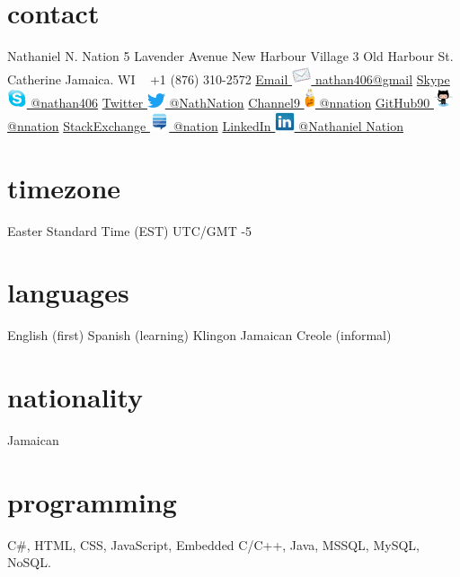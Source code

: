 \documentclass[]{friggeri-cvRS}
\begin{document}
\begin{aside}
  \section{contact}
    Nathaniel N. Nation
    5 Lavender Avenue
    New Harbour Village 3
    Old Harbour
    St. Catherine
    Jamaica. WI
    ~
    +1 (876) 310-2572
    \href{mailto:nathan406@gmail.com}{Email \includegraphics[height=16pt]{images/email.png}
    nathan406@gmail}
    \href{https://web.skype.com/en} {Skype \includegraphics[height=16pt]{images/skype.png}
    @nathan406}
    \href{https://twitter.com/NathNation}{Twitter \includegraphics[height=12pt]{images/twitter.png}
    @NathNation}
    \href{https://channel9.msdn.com/Niners/nnation}{Channel9 \includegraphics[height=16pt]{images/ch9Icon.png}
    @nnation}
    \href {https://github.com/nnation}{GitHub90 \includegraphics[height=16pt]{images/octocat.png}
    @nnation}
    \href{https://stackexchange.com/users/1427200/nation?tab=accounts}{StackExchange \includegraphics[height=16pt]{images/stackexchange.png}
    @nation}
    \href {https://www.linkedin.com/in/nathaniel-nation-5645642a/}{LinkedIn  \includegraphics[height=16pt]{images/linkedin.png}
    @Nathaniel Nation}
    \section{timezone}
    Easter Standard Time (EST)
    UTC/GMT -5
    \section{languages}
    English (first)
    Spanish (learning)
    Klingon
    Jamaican Creole (informal)
    \section{nationality}
    Jamaican
    \section{programming}
     C\#, HTML, CSS, JavaScript, Embedded C/C++, Java, MSSQL, MySQL, NoSQL.
\end{aside}
\end{document}
